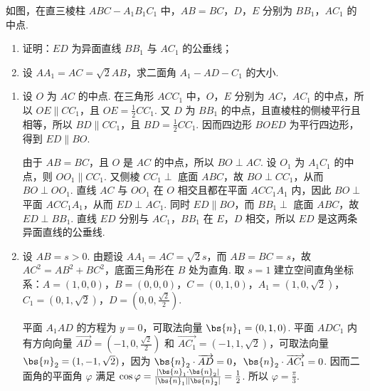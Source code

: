 \begin{problem}
如图，在直三棱柱 \(ABC - A_{1}B_{1}C_{1}\) 中，\(AB = BC\)，\(D\)，\(E\) 分别为 \(BB_{1}\)，\(AC_{1}\) 的中点.

\begin{enumerate}
\item 证明：\(ED\) 为异面直线 \(BB_{1}\) 与 \(AC_{1}\) 的公垂线；
\item 设 \(AA_{1} = AC = \sqrt{2}AB\)，求二面角 \(A_{1} - AD - C_{1}\) 的大小.
\end{enumerate}

\end{problem}

\begin{solution}
\begin{enumerate}
\item 设 \(O\) 为 \(AC\) 的中点. 在三角形 \(ACC_1\) 中，\(O\)，\(E\) 分别为 \(AC\)，\(AC_1\) 的中点，所以 \(OE\parallel CC_1\)，且 \(OE=\frac12CC_1\). 又 \(D\) 为 \(BB_1\) 的中点，且直棱柱的侧棱平行且相等，所以 \(BD\parallel CC_1\)，且 \(BD=\frac12CC_1\). 因而四边形 \(BOED\) 为平行四边形，得到 \(ED\parallel BO\).

由于 \(AB=BC\)，且 \(O\) 是 \(AC\) 的中点，所以 \(BO\perp AC\). 设 \(O_1\) 为 \(A_1C_1\) 的中点，则 \(OO_1\parallel CC_1\). 又侧棱 \(CC_1\perp\) 底面 \(ABC\)，故 \(BO\perp CC_1\)，从而 \(BO\perp OO_1\). 直线 \(AC\) 与 \(OO_1\) 在 \(O\) 相交且都在平面 \(ACC_1A_1\) 内，因此 \(BO\perp\) 平面 \(ACC_1A_1\)，从而 \(ED\perp AC_1\). 同时 \(ED\parallel BO\)，而 \(BB_1\perp\) 底面 \(ABC\)，故 \(ED\perp BB_1\). 直线 \(ED\) 分别与 \(AC_1\)，\(BB_1\) 在 \(E\)，\(D\) 相交，所以 \(ED\) 是这两条异面直线的公垂线.
\item 设 \(AB=s>0\). 由题设 \(AA_1=AC=\sqrt2s\)，而 \(AB=BC=s\)，故 \(AC^2=AB^2+BC^2\)，底面三角形在 \(B\) 处为直角. 取 \(s=1\) 建立空间直角坐标系：\(A=(1,0,0)\)，\(B=(0,0,0)\)，\(C=(0,1,0)\)，\(A_1=(1,0,\sqrt2)\)，\(C_1=(0,1,\sqrt2)\)，\(D=(0,0,\frac{\sqrt2}{2})\).

平面 \(A_1AD\) 的方程为 \(y=0\)，可取法向量 \(\bs{n}_1=(0,1,0)\). 平面 \(ADC_1\) 内有方向向量 \(\overrightarrow{AD}=(-1,0,\frac{\sqrt2}{2})\) 和 \(\overrightarrow{AC_1}=(-1,1,\sqrt2)\)，可取法向量 \(\bs{n}_2=(1,-1,\sqrt2)\)，因为 \(\bs{n}_2\cdot\overrightarrow{AD}=0\)，\(\bs{n}_2\cdot\overrightarrow{AC_1}=0\). 因而二面角的平面角 \(\varphi\) 满足
\(\cos\varphi=\frac{|\bs{n}_1\cdot\bs{n}_2|}{|\bs{n}_1||\bs{n}_2|}=\frac12\). 所以 \(\varphi=\frac\pi3\).
\end{enumerate}
\end{solution}

